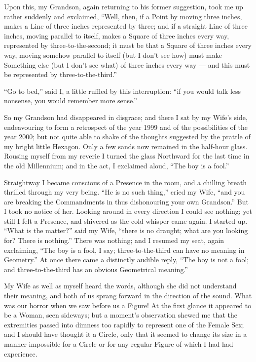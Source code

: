 \documentclass[12pt, a4paper, twoside]{memoir}
\begin{document}
Upon this, my Grandson, again returning to his former suggestion, took me up
rather suddenly and exclaimed, ``Well, then, if a Point by moving three inches,
makes a Line of three inches represented by three; and if a straight Line of
three inches, moving parallel to itself, makes a Square of three inches every
way, represented by three-to-the-second; it must be that a Square of three
inches every way, moving somehow parallel to itself (but I don't see how) must
make Something else (but I don't see what) of three inches every way --- and
this must be represented by three-to-the-third.''

``Go to bed,'' said I, a little ruffled by this interruption: ``if you would talk
less nonsense, you would remember more sense.''

So my Grandson had disappeared in disgrace; and there I sat by my Wife's side,
endeavouring to form a retrospect of the year 1999 and of the possibilities of
the year 2000; but not quite able to shake of the thoughts suggested by the
prattle of my bright little Hexagon. Only a few sands now remained in the
half-hour glass. Rousing myself from my reverie I turned the glass Northward
for the last time in the old Millennium; and in the act, I exclaimed aloud,
``The boy is a fool.''

Straightway I became conscious of a Presence in the room, and a chilling
breath thrilled through my very being. ``He is no such thing,'' cried my Wife,
``and you are breaking the Commandments in thus dishonouring your own
Grandson.'' But I took no notice of her. Looking around in every direction I
could see nothing; yet still I felt a Presence, and shivered as the cold
whisper came again. I started up. ``What is the matter?'' said my Wife, ``there
is no draught; what are you looking for? There is nothing.'' There was nothing;
and I resumed my seat, again exclaiming, ``The boy is a fool, I say;
three-to-the-third can have no meaning in Geometry.'' At once there came a
distinctly audible reply, ``The boy is not a fool; and three-to-the-third has
an obvious Geometrical meaning.''

My Wife as well as myself heard the words, although she did not understand
their meaning, and both of us sprang forward in the direction of the sound.
What was our horror when we saw before us a Figure! At the first glance it
appeared to be a Woman, seen sideways; but a moment's observation shewed me
that the extremities passed into dimness too rapidly to represent one of the
Female Sex; and I should have thought it a Circle, only that it seemed to
change its size in a manner impossible for a Circle or for any regular Figure
of which I had had experience.
\end{document}
